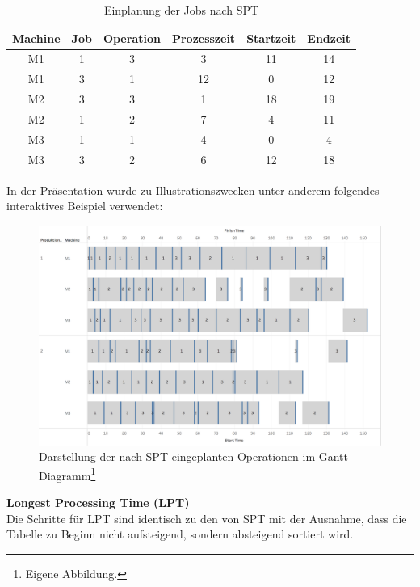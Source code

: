 \documentclass[final, english, ngerman, a4paper, 12pt, %
numbers=noenddot,
cd=true,
cdfont=false,cdfont=nohead,cdfont=nodin,
cdmath=false,
cdhead=false,
cdfoot=true,
cdcover=monochrome,
cdgeometry=symmetric,
declaration=heading,
declaration=notoc,
abstract=heading,
]{tudscrreprt}
\begin{document}
\begin{table}[H]
	\centering
	\begin{tabular}{c c c c c c}
		\toprule
		Machine & Job & Operation & Prozesszeit & Startzeit & Endzeit \\
		\midrule
		M1 & 1 & 3 & 3 & 11 & 14\\
		M1 & 3 & 1 & 12 & 0 & 12\\
		M2 & 3 & 3 & 1 & 18 & 19\\
		M2 & 1 & 2 & 7 & 4 & 11\\
		M3 & 1 & 1 & 4 & 0 & 4\\
		M3 & 3 & 2 & 6 & 12 & 18\\
		\bottomrule
	\end{tabular}
	\caption{Einplanung der Jobs nach SPT}
	\label{tab:spt2}
\end{table}

\noindent
In der Präsentation wurde zu Illustrationszwecken unter anderem folgendes interaktives Beispiel verwendet:

\begin{figure}[H]
	\centering
	\includegraphics[width=\textwidth]{./settings/spt}
	\caption[Interaktives Beispiel - Einplanung nach der SPT Regel]{Darstellung der nach SPT eingeplanten Operationen im Gantt-Diagramm\footnote{Eigene Abbildung.}}\label{fig:spt}
\end{figure}

\noindent
\textbf{Longest Processing Time (LPT)}\\
\noindent
Die Schritte für LPT sind identisch zu den von SPT mit der Ausnahme, dass die Tabelle zu Beginn nicht aufsteigend, sondern absteigend sortiert wird. \\
\end{document}
